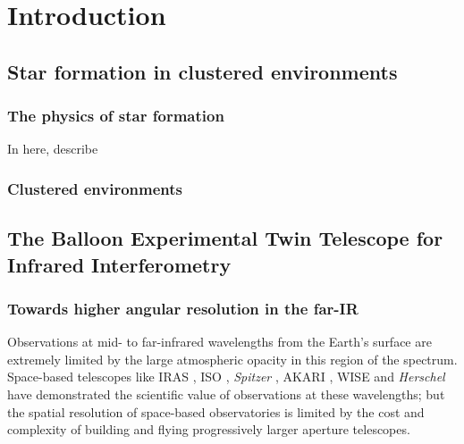 \chapter{Introduction} %

\label{chap:introduction} %



\section{Star formation in clustered environments}

\subsection{The physics of star formation}

In here, describe 

\subsection{Clustered environments}

\section{The Balloon Experimental Twin Telescope for Infrared Interferometry}

\subsection{Towards higher angular resolution in the far-IR}
Observations at mid- to far-infrared wavelengths from the Earth's surface are extremely 
limited by the large atmospheric opacity in this region of the spectrum. Space-based telescopes 
like IRAS \cite[12-100 \um;][]{1984ApJ...278L...1N}, ISO \cite[2.5-240 $\um$;][]{1996A&A...315L..27K}, \textit{Spitzer} \cite[3.6-160 $\um$;][]{2004ApJS..154....1W}, AKARI  \cite[1.7-180 $\um$;][]{2007PASJ...59S.369M}, WISE \cite[3.4-22 $\um$;][]{2010AJ....140.1868W} and \textit{Herschel} \cite[55-672 $\um$;][]{2010A&A...518L...1P} have demonstrated the scientific value of observations at 
these wavelengths; but the spatial resolution of space-based observatories is limited by the cost 
and complexity of building and flying progressively larger aperture telescopes. 

